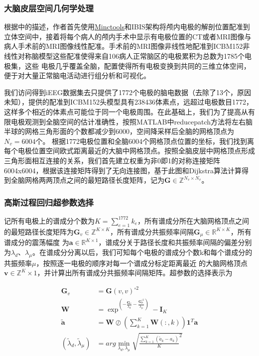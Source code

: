 \subsubsection{大脑皮层空间几何学处理}
根据\cite{frauscher2018atlas}中的描述，作者首先使用\href{www.bic.mni.mcgill.ca/ServicesSoftware/Services SoftwareMincToolKit}{Minctools}和IBIS架构将颅内电极的解剖位置配准到立体空间中，接着将每个病人的颅内手术中显示有电极位置的CT或者MRI图像与病人手术前的MRI图像线性配准。手术前的MRI图像非线性地配准到ICBM152非线性对称脑模型这些配准使得来自106病人正常脑区的电极累积为总数为1785个电极集，这些
电极几乎覆盖全脑，配置使得所有电极变换到共同的三维立体空间，便于对大量正常脑电活动进行组分析和可视化。

我们访问得到iEEG数据集去只提供了1772个电极的脑电数据（去除了13个，原因未知），提供的配准到ICBM152头模型具有238436体素点，远超过电极数目1772，这样多个相近的体素点可能位于同一个电极周围。在此基础上，我们为了提高从有限电极观测到全脑空间的估计准确性，按照MATLAB中reducepatch方法将左右脑半球的网格三角形面的个数都减少到6000，空间降采样后全脑的网格顶点为$N_v=6004$个。 根据1772电极位置和全脑6004个网格顶点位置的坐标，我们找到离每个电极位置空间欧式距离最近的大脑中网格顶点。按照全脑皮层中网格顶点形成三角形面相互连接的关系，我们首先建立权重为非0即1的对称连接矩阵6004x6004，根据该连接矩阵得到了无向连接图，基于此图和Dijkstra算法计算得到全脑网格两两顶点之间的最短路径长度矩阵，记为$\mathbf{G}\in{\mathbb{Z}^{N_v\times{N_v}}}$。

\subsubsection{高斯过程回归超参数选择}
记所有电极上的谱成分个数为$K=\sum_{e=1}^{1772}k_e$，所有谱成分所在大脑网格顶点之间的最短路径长度矩阵为$\mathbf{G}_v\in{\mathbb{Z}^{K\times{K}}}$，所有谱成分共振频率间隔$\mathbf{G}_\mu\in{\mathbb{R}^{K\times{K}}}$，所有谱成分的震荡幅度
为$\mathbf{a}\in{\mathbb{R}^{K\times1}}$，谱成分关于路径长度和共振频率间隔的偏差分别为$\lambda_d$、$\lambda_\mu$。在谱成分分离以后，我们可知每个电极的谱成分个数k和每个谱成分的共振频率$\mu$，按照逐一电极的顺序对每一个谱成分标定距离最近
的大脑网格顶点$\mathbf{v}\in{\mathbb{Z}^{K}\times1}$，并计算出所有谱成分共振频率间隔矩阵。超参数的选择表示为

\begin{equation}\label{eq15}
\begin{split}
\mathbf{G}_v& = \mathbf{G}(v,v)^{\circ2}\\
\mathbf{W}& =\exp^{(-\frac{\mathbf{G}_v}{\lambda_d}-\frac{\mathbf{G}_\mu^{\circ2}}{\lambda_\mu})}-\mathbf{I}_K\\
\tilde{\mathbf{a}}& =\mathbf{W}\oslash{(\sum_{k=1}^K\mathbf{W}(:,k))\mathbf{1}^T}\mathbf{a}\\
(\tilde{\lambda}_d,\tilde{\lambda}_\mu)& =arg\min_{\lambda_d,\lambda_\mu}\sqrt{{\frac{\sum_{k=1}^{K}(\tilde{a}_k-a_k)}{K}}^2}
\end{split}
\end{equation}

